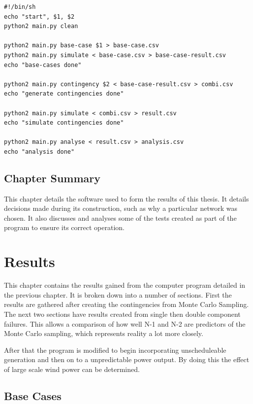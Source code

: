 \documentclass[a4paper,oneside,12pt]{report}
\begin{document}
\begin{verbatim}
#!/bin/sh
echo "start", $1, $2
python2 main.py clean

python2 main.py base-case $1 > base-case.csv
python2 main.py simulate < base-case.csv > base-case-result.csv
echo "base-cases done"

python2 main.py contingency $2 < base-case-result.csv > combi.csv
echo "generate contingencies done"

python2 main.py simulate < combi.csv > result.csv
echo "simulate contingencies done"

python2 main.py analyse < result.csv > analysis.csv
echo "analysis done"
\end{verbatim}


\section{Chapter Summary}

This chapter details the software used to form the results of this thesis. It details decisions made during its construction, such as why a particular network was chosen. It also discusses and analyses some of the tests created as part of the program to ensure its correct operation.






\chapter{Results}

This chapter contains the results gained from the computer program detailed in the previous chapter. It is broken down into a number of sections. First the results are gathered after creating the contingencies from Monte Carlo Sampling. The next two sections have results created from single then double component failures. This allows a comparison of how well N-1 and N-2 are predictors of the Monte Carlo sampling, which represents reality a lot more closely.

After that the program is modified to begin incorporating unscheduleable generation and then on to a unpredictable power output. By doing this the effect of large scale wind power can be determined.

\section{Base Cases}
\end{document}
